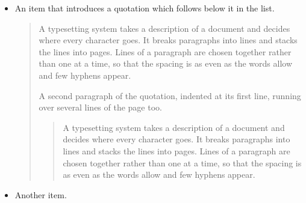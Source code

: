 \documentclass{article}
\begin{document}
\begin{itemize}
\item An item that introduces a quotation which follows below it in the list.
\begin{quotation}
A typesetting system takes a description of a document and decides where every character goes. It breaks paragraphs into lines and stacks the lines into pages. Lines of a paragraph are chosen together rather than one at a time, so that the spacing is as even as the words allow and few hyphens appear.

A second paragraph of the quotation, indented at its first line, running over several lines of the page too.
\begin{quote}
A typesetting system takes a description of a document and decides where every character goes. It breaks paragraphs into lines and stacks the lines into pages. Lines of a paragraph are chosen together rather than one at a time, so that the spacing is as even as the words allow and few hyphens appear.
\end{quote}
\end{quotation}
\item Another item.
\end{itemize}
\end{document}
